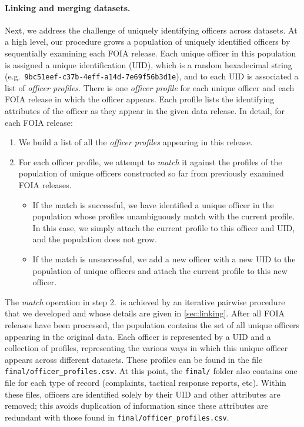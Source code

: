 \paragraph{Linking and merging datasets.}
Next, we address the challenge of uniquely identifying officers across datasets.
At a high level, our procedure grows a population of uniquely identified
officers by sequentially examining each FOIA release. Each unique officer in
this population is assigned a unique identification (UID), which is a random hexadecimal string (e.g.\
\texttt{9bc51eef-c37b-4eff-a14d-7e69f56b3d1e}), and to each UID is associated
a list of \emph{officer profiles}. There is one \emph{officer profile} for each
unique officer and each FOIA release in which the officer appears.  Each profile lists
the identifying attributes of the officer as they appear in the given data
release. In detail, for each FOIA release:
\begin{enumerate}
	\item We build a list of all the \emph{officer profiles} appearing in this
		release.
	\item For each officer profile, we attempt to \emph{match} it against the
		profiles of the population of unique officers constructed so far from
		previously examined FOIA releases.
		\begin{itemize}
			\item If the match is successful, we have identified a unique officer in
				the population whose profiles unambiguously match with the
				current profile. In this case, we simply attach the current
				profile to this officer and UID, and
				the population does not grow.
			\item If the match is unsuccessful, we add a new officer with a new UID to the population of unique
				officers and attach the current profile to this new officer.
		\end{itemize}
\end{enumerate}

The \emph{match} operation in step 2.\ is achieved by an iterative pairwise
procedure that we developed and whose details are given  in \cref{sec:linking}.
After all FOIA releases have been processed, the population contains the set of
all unique officers appearing in the original data. Each officer is represented
by a UID and a collection of profiles, representing the various ways in which
this unique officer appears across different datasets. These profiles can be
found in the file \texttt{final/officer\_profiles.csv}.
At this point, the \texttt{final/} folder also contains
one file for each type of record (complaints, tactical response reports, etc).
Within these files, officers are identified solely by their UID and other attributes
are removed; this avoids duplication of
information since these attributes are redundant with those found in
\texttt{final/officer\_profiles.csv}.

